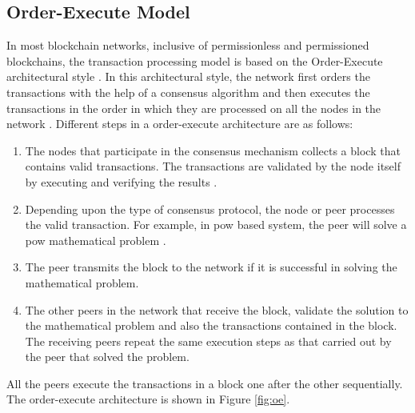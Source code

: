 \documentclass[
  a4paper,  %
  twoside,  %
  bibliography=totoc,
  headsepline,
  cleardoublepage=empty,
  parskip=half,
  draft=false
]{scrbook}
\begin{document}
\subsection{Order-Execute Model}
In most blockchain networks, inclusive of permissionless and permissioned blockchains, the transaction processing model is based on the Order-Execute architectural style \cite{HF}. In this architectural style, the network first orders the transactions with the help of a consensus algorithm and then executes the transactions in the order in which they are processed on all the nodes in the network \cite{HF}. Different steps in a order-execute architecture are as follows:
\begin{enumerate}
    \item The nodes that participate in the consensus mechanism collects a block that contains valid transactions. The transactions are validated by the node itself by executing and verifying the results \cite{HF}.
    \item Depending upon the type of consensus protocol, the node or peer processes the valid transaction. For example, in \gls{pow} based system, the peer will solve a \gls{pow} mathematical problem \cite{HF}.
    \item The peer transmits the block to the network if it is successful in solving the mathematical problem.
    \item The other peers in the network that receive the block, validate the solution to the mathematical problem and also the transactions contained in the block. The receiving peers repeat the same execution steps as that carried out by the peer that solved the problem.
\end{enumerate}
All the peers execute the transactions in a block one after the other sequentially. The order-execute architecture is shown in Figure \ref{fig:oe}.
\end{document}
